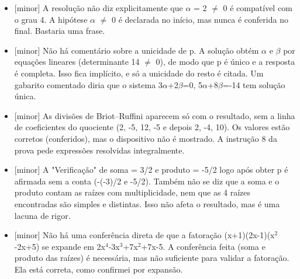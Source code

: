 \documentclass{article}%
\begin{document}
\begin{itemize}%
\item%
{[}minor{]} A resolução não diz explicitamente que $\alpha$ = 2 $\neq$ 0 é compatível com o grau 4. A hipótese $\alpha$ $\neq$ 0 é declarada no início, mas nunca é conferida no final. Bastaria uma frase.%
\item%
{[}minor{]} Não há comentário sobre a unicidade de p. A solução obtém $\alpha$ e $\beta$ por equações lineares (determinante 14 $\neq$ 0), de modo que p é único e a resposta é completa. Isso fica implícito, e só a unicidade do resto é citada. Um gabarito comentado diria que o sistema 3$\alpha$+2$\beta$=0, 5$\alpha$+8$\beta$=-14 tem solução única.%
\item%
{[}minor{]} As divisões de Briot--Ruffini aparecem só com o resultado, sem a linha de coeficientes do quociente (2, -5, 12, -5 e depois 2, -4, 10). Os valores estão corretos (conferidos), mas o dispositivo não é mostrado. A instrução 8 da prova pede expressões resolvidas integralmente.%
\item%
{[}minor{]} A "Verificação" de soma = 3/2 e produto = -5/2 logo após obter p é afirmada sem a conta (-(-3)/2 e -5/2). Também não se diz que a soma e o produto contam as raízes com multiplicidade, nem que as 4 raízes encontradas são simples e distintas. Isso não afeta o resultado, mas é uma lacuna de rigor.%
\item%
{[}minor{]} Não há uma conferência direta de que a fatoração (x+1)(2x-1)(x$^2$-2x+5) se expande em 2x$^{4}$-3x$^3$+7x$^2$+7x-5. A conferência feita (soma e produto das raízes) é necessária, mas não suficiente para validar a fatoração. Ela está correta, como confirmei por expansão.%
\end{itemize}%
\end{document}
